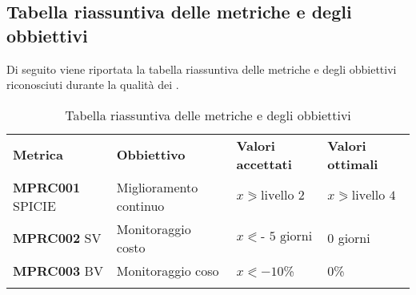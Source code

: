 \subsection{Tabella riassuntiva delle metriche e degli obbiettivi}
Di seguito viene riportata la tabella riassuntiva delle metriche e degli obbiettivi riconosciuti durante la qualità dei .
\begin{center}
	\renewcommand{\arraystretch}{1.5}
		\begin{longtable}{  p{2cm}  p{5cm} p{2.5cm}  p{2.5cm}  }
			\rowcolor{tableHeadYellow}
			\textbf{Metrica}   & \textbf{Obbiettivo} & \textbf{Valori \mbox{accettati}} & \textbf{Valori \mbox{ottimali}}\\
			\textbf{MPRC001} SPICIE & Miglioramento continuo & $x \eqslantgtr \text{livello 2}$ & $x \eqslantgtr \text{livello 4}$  \\
			\textbf{MPRC002} SV & Monitoraggio costo & $x \eqslantless \text{- 5 giorni}$ & 0 giorni \\
			\textbf{MPRC003} BV & Monitoraggio coso & $x \eqslantless -10$\% & 0\% \\
			\rowcolor{white}
			\caption{Tabella riassuntiva delle metriche e degli obbiettivi}
		\end{longtable}
\end{center}
